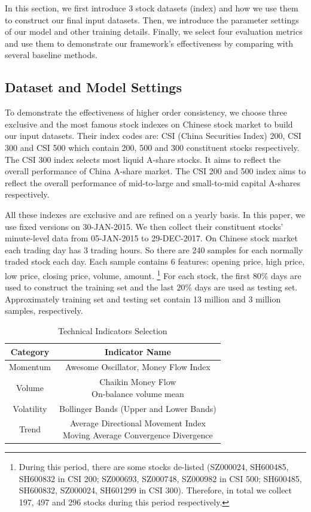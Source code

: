 \documentclass[sigconf]{acmart}
\begin{document}
In this section, we first introduce 3 stock datasets (index) and
how we use them to construct our final input datasets. Then, we
introduce the parameter settings of our model and other training
details. Finally, we select four evaluation metrics and use them
to demonstrate our framework's effectiveness by comparing with
several baseline methods.

\subsection{Dataset and Model Settings}
\label{sec:dataset}

To demonstrate the effectiveness of higher order consistency, we
choose three exclusive and the most famous stock indexes on Chinese
stock market to build our input datasets. Their index codes are:
CSI (China Securities Index) 200, CSI 300 and CSI 500 which
contain 200, 500 and 300 constituent stocks respectively. The CSI
300 index selects most liquid A-share stocks. It aims to reflect
the overall performance of China A-share market. The CSI 200 and
500 index aims to reflect the overall performance of mid-to-large
and small-to-mid capital A-shares respectively.

All these indexes are exclusive and are refined on a yearly
basis. In this paper, we use fixed versions on 30-JAN-2015. We
then collect their constituent stocks' minute-level data from
05-JAN-2015 to 29-DEC-2017. On Chinese stock market each trading
day has 3 trading hours. So there are 240 samples for each
normally traded stock each day. Each sample contains 6 features:
opening price, high price, low price, closing price, volume,
amount. \footnote{During this period, there are some stocks
  de-listed (SZ000024, SH600485, SH600832 in CSI 200; SZ000693,
  SZ000748, SZ000982 in CSI 500; SH600485, SH600832, SZ000024,
  SH601299 in CSI 300). Therefore, in total we collect 197, 497
  and 296 stocks during this period respectively.} For each
stock, the first $80\%$ days are used to construct the training
set and the last $20\%$ days are used as testing set.
Approximately training set and testing set contain 13 million and
3 million samples, respectively.

\begin{table}[H]
\centering
\small
\caption{Technical Indicators Selection}
\begin{tabular}{|c|c|} \hline
  Category&Indicator Name\\ \hline
  Momentum& Awesome Oscillator, Money Flow Index\\ \hline
  Volume& \makecell{Chaikin Money Flow\\ On-balance volume mean}\\ \hline
  Volatility& Bollinger Bands (Upper and Lower Bands)\\ \hline
  Trend& \makecell{Average Directional Movement Index\\Moving Average Convergence Divergence}\\ \hline
\end{tabular}
  \label{tab:ta}
\end{table}
\end{document}
